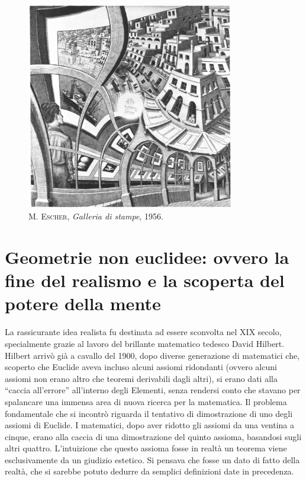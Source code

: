 \documentclass[a4paper,10pt]{article}
\begin{document}
\begin{figure}[t]
 \centering
 \includegraphics[width=343px]{./pics/escher[3].jpg}
 \caption{\textsc{M. Escher}, \textit{Galleria di stampe}, 1956.}
\end{figure}

\section[Geometrie non euclidee]{Geometrie non euclidee: ovvero la fine del realismo e la scoperta del potere della mente}

La rassicurante idea realista fu destinata ad essere sconvolta nel XIX secolo, specialmente grazie al lavoro del brillante matematico tedesco David Hilbert.
Hilbert arrivò già a cavallo del 1900, dopo diverse generazione di matematici che, scoperto che Euclide aveva incluso alcuni assiomi ridondanti (ovvero alcuni assiomi non erano altro che teoremi derivabili dagli altri), si erano dati alla “caccia all'errore” all'interno degli Elementi, senza rendersi conto che stavano per spalancare una immensa area di nuova ricerca per la matematica.
Il problema fondamentale che si incontrò riguarda il tentativo di dimostrazione di uno degli assiomi di Euclide. I matematici, dopo aver ridotto gli assiomi da una ventina a cinque, erano alla caccia di una dimostrazione del quinto assioma, basandosi sugli altri quattro. L'intuizione che questo assioma fosse in realtà un teorema viene esclusivamente da un giudizio estetico. Si pensava che fosse un dato di fatto della realtà, che si sarebbe potuto dedurre da semplici definizioni date in precedenza.
\end{document}
